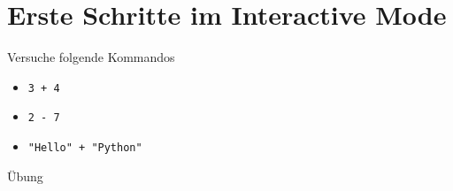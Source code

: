 \documentclass[algorithm,pgfplots,colortheme=dark]{cuzbeamer}
\begin{document}
\section{Erste Schritte im Interactive Mode}


\begin{frame}
\begin{block}{Versuche folgende Kommandos}	
	\begin{itemize}
		\item \texttt{3 + 4}
		\item \texttt{2 - 7}
		\item \texttt{"Hello" + "Python"}
	\end{itemize}
\end{block}	
\end{frame}

\begin{frame}{Übung}

\end{frame}
\end{document}
